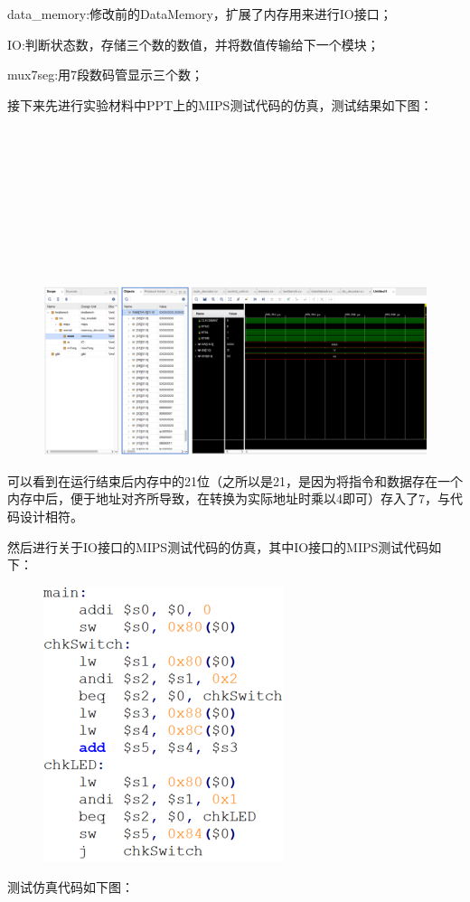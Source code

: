 \documentclass[UTF8]{article}
\begin{document}
\begin{enumerate}
			data\_memory:修改前的DataMemory，扩展了内存用来进行IO接口；
			
			IO:判断状态数，存储三个数的数值，并将数值传输给下一个模块；
			
			mux7seg:用7段数码管显示三个数；
			
			\par 接下来先进行实验材料中PPT上的MIPS测试代码的仿真，测试结果如下图：\\\\\\\\\\\\\\\\\\\
			
			\begin{figure}[htbp]
				\centering
				\includegraphics[scale=0.4]{2-3-1.png}
			\end{figure}
			\par 可以看到在运行结束后内存中的21位（之所以是21，是因为将指令和数据存在一个内存中后，便于地址对齐所导致，在转换为实际地址时乘以4即可）存入了7，与代码设计相符。
			
			\par 然后进行关于IO接口的MIPS测试代码的仿真，其中IO接口的MIPS测试代码如下：
			
			\begin{figure}[htbp]
				\centering
				\includegraphics[scale=0.5]{2-3-2.png}
			\end{figure}
			\par 测试仿真代码如下图：\\\\\\
			

\end{enumerate}
\end{document}
